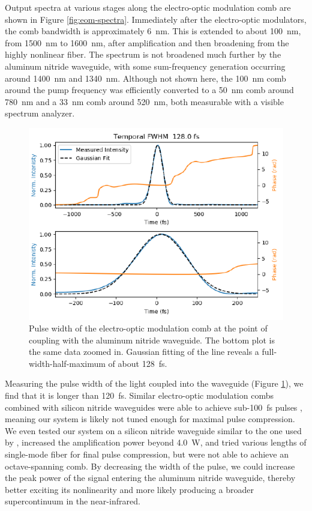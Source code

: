 Output spectra at various stages along the electro-optic modulation comb are shown in Figure \ref{fig:eom-spectra}. Immediately after the electro-optic modulators, the comb bandwidth is approximately 6~\si{\nano\meter}. This is extended to about 100~\si{\nano\meter}, from 1500~\si{\nano\meter} to 1600~\si{\nano\meter}, after amplification and then broadening from the highly nonlinear fiber. The spectrum is not broadened much further by the aluminum nitride waveguide, with some sum-frequency generation occurring around 1400~\si{\nano\meter} and 1340~\si{\nano\meter}. Although not shown here, the 100~\si{\nano\meter} comb around the pump frequency was efficiently converted to a 50~\si{\nano\meter} comb around 780~\si{\nano\meter} and a 33~\si{\nano\meter} comb around 520~\si{\nano\meter}, both measurable with a visible spectrum analyzer.

\begin{figure}
    \centering
    \includegraphics[width=\textwidth]{figures-3/eom-pulse.pdf}
    \caption[Electro-optic modulation comb pulse width]{Pulse width of the electro-optic modulation comb at the point of coupling with the aluminum nitride waveguide. The bottom plot is the same data zoomed in. Gaussian fitting of the line reveals a full-width-half-maximum of about 128~\si{\femto\second}.}
    \label{fig:eom-pulse}
\end{figure}

Measuring the pulse width of the light coupled into the waveguide (Figure \ref{fig:eom-pulse}), we find that it is longer than 120~\si{\femto\second}. Similar electro-optic modulation combs combined with silicon nitride waveguides were able to achieve sub-100~\si{\femto\second} pulses \citep{carlson_ultrafast_2017, obrzud_visible_2019}, meaning our system is likely not tuned enough for maximal pulse compression. We even tested our system on a silicon nitride waveguide similar to the one used by \citet{carlson_ultrafast_2017}, increased the amplification power beyond 4.0~\si{\watt}, and tried various lengths of single-mode fiber for final pulse compression, but were not able to achieve an octave-spanning comb. By decreasing the width of the pulse, we could increase the peak power of the signal entering the aluminum nitride waveguide, thereby better exciting its nonlinearity and more likely producing a broader supercontinuum in the near-infrared.

